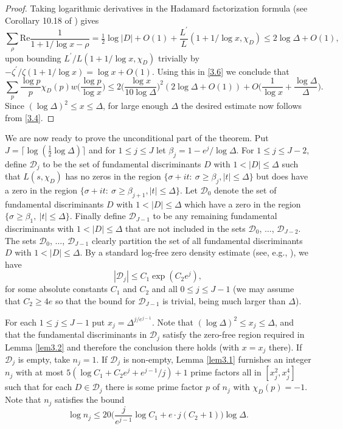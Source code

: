 \documentclass[11pt,makeidx, reqno]{amsart}
\theoremstyle{mystyle}
\theoremstyle{definition}
\begin{document}
\begin{proof}
Taking logarithmic derivatives in the Hadamard factorization formula (see Corollary 10.18 of \cite{montgomeryVaughan}) gives 
$$
 \sum_{\rho}\text{Re} \frac{1}{1+1/\log x -\rho} = \tfrac 12 \log |D| +O(1) + \frac{L^{\prime}}{L} (1+1/\log x, \chi_D) \le 2 \log \Delta + O(1),
 $$
upon bounding $L^{\prime}/L(1+1/\log x, \chi_D)$ trivially by $-\zeta^{\prime}/\zeta(1+1/\log x) = \log x + O(1)$. 
Using this in \eqref{3.6} we conclude that 
$$
\sum_{p} \frac{\log p}{p} \chi_D(p) w\Big(\frac{\log p}{\log x}\Big)
\le 2\Big(\frac{\log x}{10\log \Delta}\Big)^2 (2\log \Delta +O(1)) + 
O\Big(\frac{1}{\log x} + \frac{\log \Delta}{\Delta}\Big). 
$$
Since $(\log \Delta)^2 \le x \le \Delta$, for large enough $\Delta$ the desired estimate now follows from \eqref{3.4}.
\end{proof} 
 
 
 

We are now ready to prove the unconditional part of the theorem.  Put $J= \lceil \log(\frac 12 \log \Delta)\rceil$ and for $1\le j\le J$ let $\beta_j =1 - e^{j}/\log \Delta$.  For $1\le j\le J-2$, define ${\mathcal D}_j$ to be the set of fundamental discriminants $D$ with $1<|D|\le \Delta$ such that $L(s,\chi_D)$ has no zeros in the region $\{\sigma +it: \ \sigma \ge \beta_j, |t|\le \Delta\}$ but does have a zero in the region $\{ \sigma+it: \ \sigma \ge \beta_{j+1}, |t| \le \Delta\}$.  Let ${\mathcal D}_0$ denote the set of fundamental discriminants $D$ with $1<|D|\le \Delta$ which have a zero in the region $\{\sigma \ge \beta_1, \ |t|\le \Delta\}$.  Finally define ${\mathcal D}_{J-1}$ to be any remaining fundamental discriminants with $1<|D|\le \Delta$ that are not included in the sets ${\mathcal D}_0$, $\ldots$, ${\mathcal D}_{J-2}$.   The sets ${\mathcal D}_0$, $\ldots$, ${\mathcal D}_{J-1}$ clearly partition the set of all fundamental discriminants $D$ with $1<|D|\le \Delta$.  By a standard log-free zero density estimate (see, e.g., \cite{gallagherLarge}), we have 
\begin{equation}\label{zeroDensityDj}
|\mathcal{D}_j| \le C_1 \exp( C_2 e^j),  
\end{equation}
for some absolute constants $C_1$ and $C_2$ and all  $0 \le j \le J-1$ (we may assume that $C_2\ge 4e$ so that the bound for ${\mathcal D}_{J-1}$ is trivial, being much larger than $\Delta$). 



 
For each $1\le j\le J-1$ put $x_j = \Delta^{j/e^{j-1}}$.  Note that $(\log \Delta)^2 \le x_j \le \Delta$, and that the fundamental discriminants in ${\mathcal D}_j$ satisfy the zero-free region required in Lemma \ref{lem3.2} and therefore the conclusion there holds (with $x=x_j$ there).   If ${\mathcal D}_j$ is empty, take $n_j=1$.  If ${\mathcal D}_j$ is non-empty, Lemma \ref{lem3.1}  furnishes an integer $n_j$ with at most $5(\log C_1 + C_2 e^j + e^{j-1}/j)+1$ prime factors all in $[x_j^2,x_j^4]$ such that for each $D\in {\mathcal D}_j$ there is some prime factor $p$ of $n_j$ with $\chi_D(p)=-1$.  Note that $n_j$ satisfies the bound 
\begin{equation}
    \label{3.8}
   \log  n_j \le 20 \Big( \frac{j}{e^{j-1}}\log C_1 + e\cdot  j(C_2+1)\Big) \log \Delta.
\end{equation} 
\end{document}
